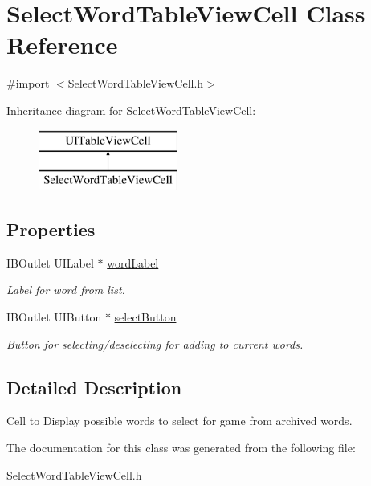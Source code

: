 \hypertarget{interface_select_word_table_view_cell}{\section{Select\+Word\+Table\+View\+Cell Class Reference}
\label{interface_select_word_table_view_cell}
}


{\ttfamily \#import $<$Select\+Word\+Table\+View\+Cell.\+h$>$}

Inheritance diagram for Select\+Word\+Table\+View\+Cell\+:\begin{figure}[H]
\begin{center}
\leavevmode
\includegraphics[height=2.000000cm]{interface_select_word_table_view_cell}
\end{center}
\end{figure}
\subsection*{Properties}
\begin{DoxyCompactItemize}
\item 
\hypertarget{interface_select_word_table_view_cell_ae779b55a4f98bc59ed59bcd7443c6298}{I\+B\+Outlet U\+I\+Label $\ast$ \hyperlink{interface_select_word_table_view_cell_ae779b55a4f98bc59ed59bcd7443c6298}{word\+Label}}\label{interface_select_word_table_view_cell_ae779b55a4f98bc59ed59bcd7443c6298}

\begin{DoxyCompactList}\small\item\em Label for word from list. \end{DoxyCompactList}\item 
\hypertarget{interface_select_word_table_view_cell_a74a05dda4ca36d1499b52df54c5a2210}{I\+B\+Outlet U\+I\+Button $\ast$ \hyperlink{interface_select_word_table_view_cell_a74a05dda4ca36d1499b52df54c5a2210}{select\+Button}}\label{interface_select_word_table_view_cell_a74a05dda4ca36d1499b52df54c5a2210}

\begin{DoxyCompactList}\small\item\em Button for selecting/deselecting for adding to current words. \end{DoxyCompactList}\end{DoxyCompactItemize}


\subsection{Detailed Description}
Cell to Display possible words to select for game from archived words. 

The documentation for this class was generated from the following file\+:\begin{DoxyCompactItemize}
\item 
Select\+Word\+Table\+View\+Cell.\+h\end{DoxyCompactItemize}
